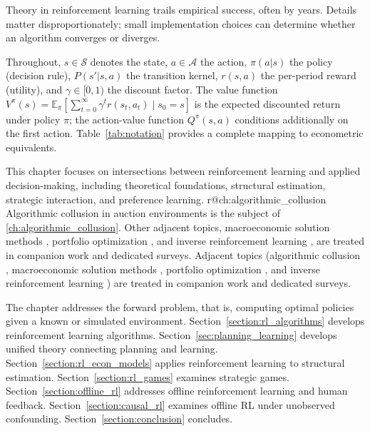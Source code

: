Theory in reinforcement learning trails empirical success, often by years. Details matter disproportionately; small implementation choices can determine whether an algorithm converges or diverges.

Throughout, $s \in \mathcal{S}$ denotes the state, $a \in \mathcal{A}$ the action, $\pi(a|s)$ the policy (decision rule), $P(s'|s,a)$ the transition kernel, $r(s,a)$ the per-period reward (utility), and $\gamma \in [0,1)$ the discount factor. The value function $V^\pi(s) = \mathbb{E}_\pi[\sum_{t=0}^\infty \gamma^t r(s_t, a_t) \mid s_0 = s]$ is the expected discounted return under policy $\pi$; the action-value function $Q^\pi(s,a)$ conditions additionally on the first action. Table~\ref{tab:notation} provides a complete mapping to econometric equivalents.

This chapter focuses on intersections between reinforcement learning and applied decision-making, including theoretical foundations, structural estimation, strategic interaction, and preference learning. \ifcsname r@ch:algorithmic_collusion\endcsname
Algorithmic collusion in auction environments \citep{Calvano2020} is the subject of \cref{ch:algorithmic_collusion}. Other adjacent topics, macroeconomic solution methods \citep{FernandezVillaverdeNunoPerla2024}, portfolio optimization \citep{HamblyXuYang2023}, and inverse reinforcement learning \citep{RustRawat2026}, are treated in companion work and dedicated surveys.
\else
Adjacent topics (algorithmic collusion \citep{Calvano2020,Rawat2026collusion}, macroeconomic solution methods \citep{FernandezVillaverdeNunoPerla2024}, portfolio optimization \citep{HamblyXuYang2023}, and inverse reinforcement learning \citep{RustRawat2026}) are treated in companion work and dedicated surveys.
\fi

The chapter addresses the forward problem, that is, computing optimal policies given a known or simulated environment. Section~\ref{section:rl_algorithms} develops reinforcement learning algorithms. Section~\ref{sec:planning_learning} develops unified theory connecting planning and learning. Section~\ref{section:rl_econ_models} applies reinforcement learning to structural estimation. Section~\ref{section:rl_games} examines strategic games. Section~\ref{section:offline_rl} addresses offline reinforcement learning and human feedback. Section~\ref{section:causal_rl} examines offline RL under unobserved confounding. Section~\ref{section:conclusion} concludes.

